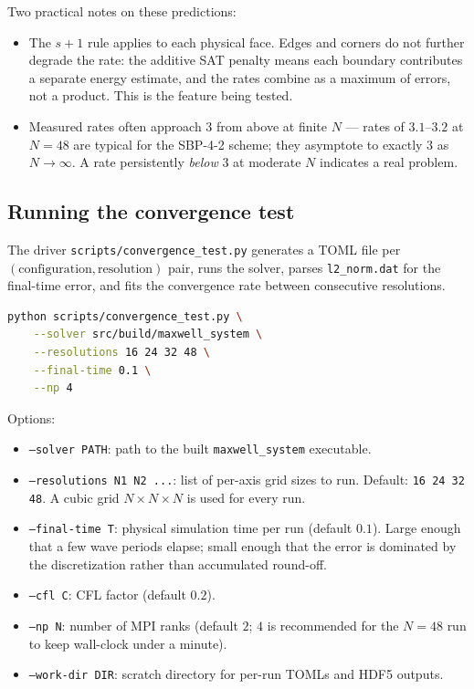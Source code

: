 \documentclass[11pt]{article}
\begin{document}
Two practical notes on these predictions:

\begin{itemize}
  \item The $s + 1$ rule applies to each physical face. Edges and
    corners do not further degrade the rate: the additive SAT
    penalty means each boundary contributes a separate energy
    estimate, and the rates combine as a maximum of errors, not
    a product.  This is the feature being tested.
  \item Measured rates often approach $3$ from above at finite $N$
    — rates of $3.1$--$3.2$ at $N = 48$ are typical for the SBP-4-2
    scheme; they asymptote to exactly $3$ as $N \to \infty$.  A rate
    persistently \emph{below} $3$ at moderate $N$ indicates a real
    problem.
\end{itemize}

\subsection{Running the convergence test}

The driver \texttt{scripts/convergence\_test.py} generates a TOML
file per $(\text{configuration}, \text{resolution})$ pair, runs the
solver, parses \texttt{l2\_norm.dat} for the final-time error, and
fits the convergence rate between consecutive resolutions.

\begin{lstlisting}[language=bash]
python scripts/convergence_test.py \
    --solver src/build/maxwell_system \
    --resolutions 16 24 32 48 \
    --final-time 0.1 \
    --np 4
\end{lstlisting}

Options:
\begin{itemize}
  \item \texttt{--solver PATH}: path to the built \texttt{maxwell\_system}
    executable.
  \item \texttt{--resolutions N1 N2 ...}: list of per-axis grid sizes
    to run. Default: \texttt{16 24 32 48}. A cubic grid $N \times N
    \times N$ is used for every run.
  \item \texttt{--final-time T}: physical simulation time per run
    (default $0.1$). Large enough that a few wave periods elapse;
    small enough that the error is dominated by the discretization
    rather than accumulated round-off.
  \item \texttt{--cfl C}: CFL factor (default $0.2$).
  \item \texttt{--np N}: number of MPI ranks (default $2$; $4$ is
    recommended for the $N = 48$ run to keep wall-clock under a
    minute).
  \item \texttt{--work-dir DIR}: scratch directory for per-run
    TOMLs and HDF5 outputs.
\end{itemize}
\end{document}
